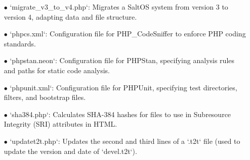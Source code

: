 \documentclass[a4paper]{article}
\begin{document}
\begin{itemize}
\item[\color{myblue}$\bullet$] `migrate\_v3\_to\_v4.php`: Migrates a SaltOS system from version 3 to version 4, adapting data and file structure.
\item[\color{myblue}$\bullet$] `phpcs.xml`: Configuration file for PHP\_CodeSniffer to enforce PHP coding standards.
\item[\color{myblue}$\bullet$] `phpstan.neon`: Configuration file for PHPStan, specifying analysis rules and paths for static code analysis.
\item[\color{myblue}$\bullet$] `phpunit.xml`: Configuration file for PHPUnit, specifying test directories, filters, and bootstrap files.
\item[\color{myblue}$\bullet$] `sha384.php`: Calculates SHA-384 hashes for files to use in Subresource Integrity (SRI) attributes in HTML.
\item[\color{myblue}$\bullet$] `updatet2t.php`: Updates the second and third lines of a `.t2t` file (used to update the version and date of `devel.t2t`).

\end{itemize}

\end{document}
